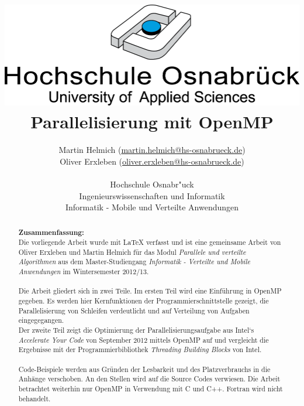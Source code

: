 \documentclass[11pt]{scrartcl}
\begin{document}
\author{%
	Martin Helmich \small(\href{mailto:martin.helmich@hs-osnabrueck.de}{martin.helmich@hs-osnabrueck.de})\\%
	Oliver Erxleben \small(\href{mailto:oliver.erxleben@hs-osnabrueck.de}{oliver.erxleben@hs-osnabrueck.de})\\ \\%
	Hochschule Osnabr"uck \\%
	Ingenieurswissenschaften und Informatik \\%
	Informatik - Mobile und Verteilte Anwendungen }

\title{\includegraphics[scale=0.75,keepaspectratio]{img/hs_os.png}\linebreak \linebreak Parallelisierung mit OpenMP}

\maketitle
\thispagestyle{empty}
\tableofcontents
\listoffigures

\lstlistoflistings

\pagebreak
\thispagestyle{empty}
\begin{abstract}
\textbf{Zusammenfassung:}\\ 	
Die vorliegende Arbeit wurde mit LaTeX verfasst und ist eine gemeinsame Arbeit von Oliver Erxleben und Martin Helmich für das Modul \textit{Parallele und verteilte Algorithmen} aus dem Master-Studiengang \textit{Informatik - Verteilte und Mobile Anwendungen} im Wintersemester 2012/13. \\ 
\\
Die Arbeit gliedert sich in zwei Teile. Im ersten Teil wird eine Einführung in OpenMP gegeben. Es werden hier Kernfunktionen der Programmierschnittstelle gezeigt, die Parallelisierung von Schleifen verdeutlicht und auf Verteilung von Aufgaben eingegegangen.\\
Der zweite Teil zeigt die Optimierung der Parallelisierungsaufgabe aus Intel`s \textit{Accelerate Your Code} von September 2012 mittels OpenMP auf und vergleicht die Ergebnisse mit der Programmierbibliothek \textit{Threading Building Blocks} von Intel.\\
\\
Code-Beispiele werden aus Gründen der Lesbarkeit und des Platzverbrauchs in die Anhänge verschoben. An den Stellen wird auf die Source Codes verwiesen. Die Arbeit betrachtet weiterhin nur OpenMP in Verwendung mit C und C++. Fortran wird nicht behandelt.
\end{abstract}
\end{document}
